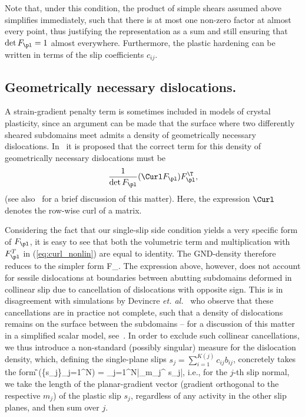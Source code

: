 \documentclass[11pt,reqno]{amsart}
\theoremstyle{plain}
\theoremstyle{definition}
\theoremstyle{remark}
\begin{document}
Note that, under this condition, the product of simple shears assumed above simplifies immediately, such that there is at most one non-zero factor at almost every point, thus justifying the representation as a sum and still ensuring that $\det F_\pl =1$ almost everywhere. Furthermore, the plastic hardening can be written in terms of the slip coefficients $c_{ij}$.

\subsection{Geometrically necessary dislocations.}

A strain-gradient penalty term is sometimes included in models of crystal plasticity, since an argument can be made that the surface where two differently sheared subdomains meet admits a density of geometrically necessary dislocations. In~\cite{Cermelli_2001} it is proposed that the correct term for this density of geometrically necessary dislocations must be 
\begin{equation}
\label{eq:curl_nonlin}
\frac{1}{\det F_\pl} (\Curl F_\pl) F_\pl^\T,
\end{equation}
(see also~\cite{MM} for a brief discussion of this matter). Here, the expression $\Curl$ denotes the row-wise curl of a matrix.

Considering the fact that our single-slip side condition yields a very specific form of $F_\pl$, it is easy to see that both the volumetric term and multiplication with $F_\pl^T$ in (\ref{eq:curl_nonlin}) are equal to identity. The GND-density therefore reduces to the simpler form
\be\label{eq:curl_lin}
\Curl F_\pl.
\ee
The expression above, however, does not account for sessile dislocations at boundaries between abutting subdomains deformed in collinear slip due to cancellation of dislocations with opposite sign. This is in disagreement with simulations by Devincre \textit{et. al.}~\cite{Devincre1, Devincre2} who observe that these cancellations are in practice not complete, such that a density of dislocations remains on the surface between the subdomains -- for a discussion of this matter in a simplified scalar model, see~\cite[Chapter 4]{co}. In order to exclude such collinear cancellations, we thus introduce a non-standard (possibly singular) measure for the dislocation density, which, defining the single-plane slips $ s_j = \sum_{i=1}^{K(j)} c_{ij}b_{ij}$, concretely takes the form
\be\label{mod_curl}
\G\left(\{s_j\}_{j=1}^{N}\right) = \sum_{j=1}^N|\nabla_{m_j^\perp} s_j|,
\ee
i.e., for the $j$-th slip normal, we take the length of the planar-gradient vector (gradient orthogonal to the respective $m_j$) of the plastic slip $s_j$, regardless of any activity in the other slip planes, and then sum over $j$.
\end{document}
